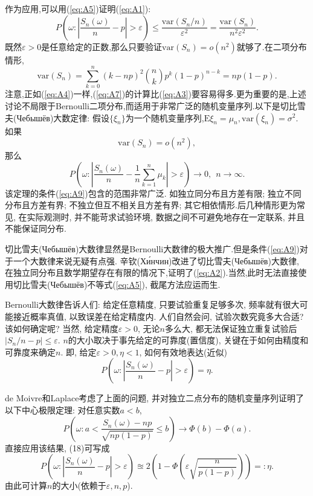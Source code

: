 作为应用,可以用(\ref{eq:A5})证明(\ref{eq:A1}):
\begin{equation}\label{eq:A6}
P\left(\omega:\left|\frac{S_n(\omega)}{n}-p\right|>\varepsilon \right)
\leqslant \frac{\mathrm{var}(S_n/n)}{\varepsilon^2} = \frac{\mathrm{var}(S_n)}{n^2\varepsilon^2}.
\end{equation}
既然$\varepsilon>0$是任意给定的正数,那么只要验证$\mathrm{var}(S_n) = o(n^2)$就够了.在二项分布情形,
\begin{equation}\label{eq:A7}
\mathrm{var}(S_n) = \sum_{k=0}^n(k-np)^2\binom{n}{k}p^k(1-p)^{n-k} = np(1-p).
\end{equation}
注意,正如(\ref{eq:A4})一样,(\ref{eq:A7})的计算比(\ref{eq:A3})要容易得多.更为重要的是,上述讨论不局限于Bernoulli二项分布,而适用于非常广泛的随机变量序列.以下是切比雪夫(Чебышёв)大数定律:
假设$\{\xi_n\}$为一个随机变量序列,$\mathrm{E}\xi_n = \mu_n, \mathrm{var}(\xi_n) = \sigma^2$. 如果\begin{equation}\label{eq:A8}
\mathrm{var}(S_n) = o(n^2),
\end{equation}
那么\begin{equation}\label{eq:A9}
P\left(\omega:\left|\frac{S_n(\omega)}{n}-\frac{1}{n}\sum_{k=1}^n\mu_k\right|>\varepsilon \right)\to 0,~~n\to\infty.
\end{equation}
该定理的条件(\ref{eq:A9})包含的范围非常广泛. 如独立同分布且方差有限; 独立不同分布且方差有界; 不独立但互不相关且方差有界; 其它相依情形.后几种情形更为常见, 在实际观测时, 并不能苛求试验环境, 数据之间不可避免地存在一定联系, 并且不能保证同分布.

切比雪夫(Чебышёв)大数律显然是Bernoulli大数律的极大推广.但是条件(\ref{eq:A9})对于一个大数律来说无疑有点强. 辛钦(Хи́нчин)改进了切比雪夫(Чебышёв)大数律, 在独立同分布且数学期望存在有限的情况下,证明了(\ref{eq:A2}).当然,此时无法直接使用切比雪夫(Чебышёв)不等式(\ref{eq:A5}), 截尾方法应运而生.

Bernoulli大数律告诉人们: 给定任意精度, 只要试验重复足够多次, 频率就有很大可能接近概率真值, 以致误差在给定精度内. 人们自然会问, 试验次数究竟多大合适? 该如何确定呢? 当然, 给定精度$\varepsilon>0$, 无论$n$多么大, 都无法保证独立重复试验后$|S_n/n-p|\leqslant\varepsilon$. $n$的大小取决于事先给定的可靠度(置信度), 关键在于如何由精度和可靠度来确定$n$. 即, 给定$\varepsilon>0,\eta<1$, 如何有效地表达(近似)\begin{equation}\label{eq:A10}
P\left( \omega:\left| \frac{S_n(\omega)}{n}-p \right|>\varepsilon \right) = \eta.
\end{equation}

de Moivre和Laplace考虑了上面的问题, 并对独立二点分布的随机变量序列证明了以下中心极限定理: 对任意实数$a<b$,\begin{equation}\label{eq:A11}
P\left( \omega:a<\frac{S_n(\omega)-np}{\sqrt{np(1-p)}} \leqslant b  \right) \to \Phi(b)-\Phi(a).
\end{equation}
直接应用该结果, (18)可写成\begin{equation}\label{eq:A12}
P\left( \omega:\left| \frac{S_n(\omega)}{n}-p \right|>\varepsilon \right) \approxeq 2\left( 1-\Phi\left(\varepsilon\sqrt{\frac{n}{p(1-p)}}\right) \right)=: \eta.
\end{equation}
由此可计算$n$的大小(依赖于$\varepsilon,n,p$).

